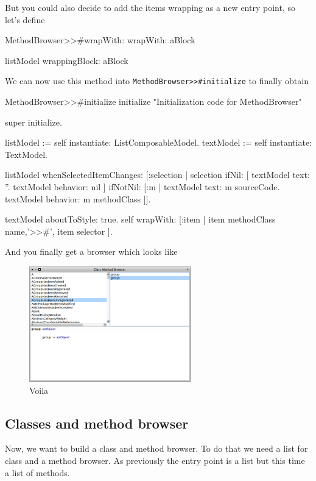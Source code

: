 \documentclass[a4paper,10pt,twoside]{book}
\begin{document}
But you could also decide to add the items wrapping as a new entry point, so let's define 
\begin{method}{MethodBrowser>>\#wrapWith:}
wrapWith: aBlock

	listModel wrappingBlock: aBlock
\end{method}

We can now use this method into \verb+MethodBrowser>>#initialize+ to finally obtain
\begin{method}{MethodBrowser>>\#initialize}
initialize
	"Initialization code for MethodBrowser"

	super initialize.

	listModel := self instantiate: ListComposableModel.
	textModel := self instantiate: TextModel.
		
	listModel whenSelectedItemChanges: [:selection |
		selection
			ifNil: [
				textModel text: ''.
				textModel behavior: nil ]
			ifNotNil: [:m | 
				textModel text: m sourceCode.
				textModel behavior: m methodClass ]].
	
	textModel aboutToStyle: true.
	self wrapWith: [:item | item methodClass name,'>>#', item selector ].
\end{method}

And you finally get a browser which looks like 
\begin{figure}[ht]
\begin{center}
	\includegraphics[width=7cm]{MethodBrowser5}
	\caption{Voila}
\end{center}
\end{figure}

\subsection{Classes and method browser}

Now, we want to build a class and method browser. To do that we need a list for class and a method browser. As previously the entry point is a list but this time a list of methods.
\end{document}
